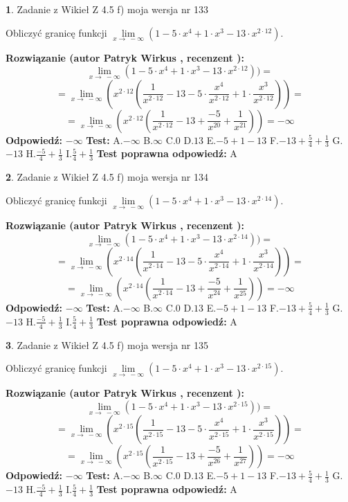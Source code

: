 \documentclass[12pt, a4paper]{article}
\theoremstyle{definition} %
\newtheorem{zad}{}
\newcommand{\zadStart}[1]{\begin{zad}#1\newline}
\newcommand{\zadStop}{\end{zad}}
\newcommand{\rozwStart}[2]{\noindent \textbf{Rozwiązanie (autor #1 , recenzent #2): }\newline}
\newcommand{\rozwStop}{\newline}
\newcommand{\odpStart}{\noindent \textbf{Odpowiedź:}\newline}
\newcommand{\odpStop}{\newline}
\newcommand{\testStart}{\noindent \textbf{Test:}\newline}
\newcommand{\testStop}{\newline}
\newcommand{\kluczStart}{\noindent \textbf{Test poprawna odpowiedź:}\newline}
\newcommand{\kluczStop}{\newline}
\begin{document}
\zadStart{Zadanie z Wikieł Z 4.5 f) moja wersja nr 133}



Obliczyć granicę funkcji  $\lim\limits_{x\to\ -\infty}(1 - 5 \cdot x^{4}+1 \cdot x^{3}- 13 \cdot x^{2\cdot12})$.
\zadStop
\rozwStart{Patryk Wirkus}{}
$$\lim\limits_{x\to\ -\infty}(1 - 5 \cdot x^{4}+1 \cdot x^{3}- 13 \cdot x^{2\cdot12}))=$$
$$=\lim\limits_{x\to\ -\infty}(x^{2\cdot12}(\frac{1}{x^{2\cdot12}}-13 -5 \cdot \frac{x^{4}}{x^{2\cdot12}}+1 \cdot \frac{x^{3}}{x^{2\cdot12}}))=$$
$$=\lim\limits_{x\to\ -\infty}(x^{2\cdot12}(\frac{1}{x^{2\cdot12}}-13 + \frac{-5}{x^{20}}+ \frac{1}{x^{21}}))=-\infty$$
\rozwStop
\odpStart
$-\infty$
\odpStop
\testStart
A.$-\infty$ B.$\infty$ C.$0$ D.$13$ E.$-5 + 1 - 13$
F.$-13+\frac{5}{4}+\frac{1}{3}$ G.$-13$
H.$\frac{-5}{4}+\frac{1}{3}$
I.$\frac{5}{4}+\frac{1}{3}$
\testStop
\kluczStart
A
\kluczStop



\zadStart{Zadanie z Wikieł Z 4.5 f) moja wersja nr 134}



Obliczyć granicę funkcji  $\lim\limits_{x\to\ -\infty}(1 - 5 \cdot x^{4}+1 \cdot x^{3}- 13 \cdot x^{2\cdot14})$.
\zadStop
\rozwStart{Patryk Wirkus}{}
$$\lim\limits_{x\to\ -\infty}(1 - 5 \cdot x^{4}+1 \cdot x^{3}- 13 \cdot x^{2\cdot14}))=$$
$$=\lim\limits_{x\to\ -\infty}(x^{2\cdot14}(\frac{1}{x^{2\cdot14}}-13 -5 \cdot \frac{x^{4}}{x^{2\cdot14}}+1 \cdot \frac{x^{3}}{x^{2\cdot14}}))=$$
$$=\lim\limits_{x\to\ -\infty}(x^{2\cdot14}(\frac{1}{x^{2\cdot14}}-13 + \frac{-5}{x^{24}}+ \frac{1}{x^{25}}))=-\infty$$
\rozwStop
\odpStart
$-\infty$
\odpStop
\testStart
A.$-\infty$ B.$\infty$ C.$0$ D.$13$ E.$-5 + 1 - 13$
F.$-13+\frac{5}{4}+\frac{1}{3}$ G.$-13$
H.$\frac{-5}{4}+\frac{1}{3}$
I.$\frac{5}{4}+\frac{1}{3}$
\testStop
\kluczStart
A
\kluczStop



\zadStart{Zadanie z Wikieł Z 4.5 f) moja wersja nr 135}



Obliczyć granicę funkcji  $\lim\limits_{x\to\ -\infty}(1 - 5 \cdot x^{4}+1 \cdot x^{3}- 13 \cdot x^{2\cdot15})$.
\zadStop
\rozwStart{Patryk Wirkus}{}
$$\lim\limits_{x\to\ -\infty}(1 - 5 \cdot x^{4}+1 \cdot x^{3}- 13 \cdot x^{2\cdot15}))=$$
$$=\lim\limits_{x\to\ -\infty}(x^{2\cdot15}(\frac{1}{x^{2\cdot15}}-13 -5 \cdot \frac{x^{4}}{x^{2\cdot15}}+1 \cdot \frac{x^{3}}{x^{2\cdot15}}))=$$
$$=\lim\limits_{x\to\ -\infty}(x^{2\cdot15}(\frac{1}{x^{2\cdot15}}-13 + \frac{-5}{x^{26}}+ \frac{1}{x^{27}}))=-\infty$$
\rozwStop
\odpStart
$-\infty$
\odpStop
\testStart
A.$-\infty$ B.$\infty$ C.$0$ D.$13$ E.$-5 + 1 - 13$
F.$-13+\frac{5}{4}+\frac{1}{3}$ G.$-13$
H.$\frac{-5}{4}+\frac{1}{3}$
I.$\frac{5}{4}+\frac{1}{3}$
\testStop
\kluczStart
A
\kluczStop
\end{document}
